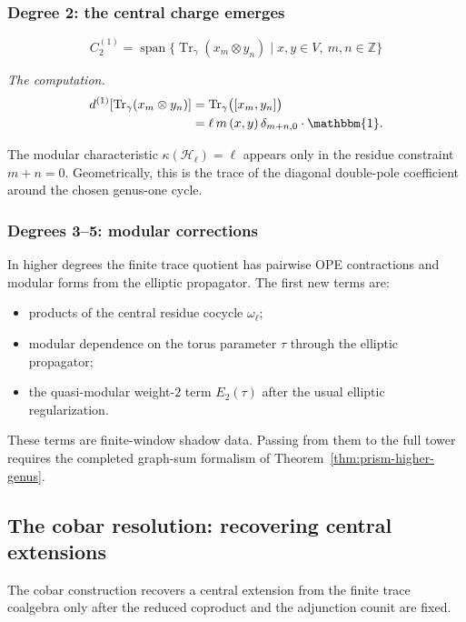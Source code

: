 \subsubsection{Degree 2: the central charge emerges}

\[C_2^{(1)} = \operatorname{span}\{
\operatorname{Tr}_\gamma(x_m \otimes y_n)
\mid x,y\in V,\ m,n\in\mathbb Z
\}\]

\emph{The computation.}
\begin{align}
d^{(1)}[\operatorname{Tr}_\gamma(x_m \otimes y_n)]
&= \operatorname{Tr}_\gamma\bigl([x_m,y_n]\bigr) \\
&= \ell\,m\,(x,y)\,\delta_{m+n,0}\cdot \mathbbm{1}.
\end{align}

The modular characteristic $\kappa(\mathcal H_\ell)=\ell$ appears only in the residue
constraint $m+n=0$. Geometrically, this is the trace of the diagonal
double-pole coefficient around the chosen genus-one cycle.

\subsubsection{Degrees 3--5: modular corrections}

In higher degrees the finite trace quotient has pairwise OPE
contractions and modular forms from the elliptic propagator. The first
new terms are:
\begin{itemize}
\item products of the central residue cocycle $\omega_\ell$;
\item modular dependence on the torus parameter $\tau$ through the
 elliptic propagator;
\item the quasi-modular weight-$2$ term $E_2(\tau)$ after the usual
 elliptic regularization.
\end{itemize}
These terms are finite-window shadow data. Passing from them to the
full tower requires the completed graph-sum formalism of
Theorem~\ref{thm:prism-higher-genus}.

\subsection{The cobar resolution: recovering central extensions}

The cobar construction recovers a central extension from the finite
trace coalgebra only after the reduced coproduct and the adjunction
counit are fixed.

